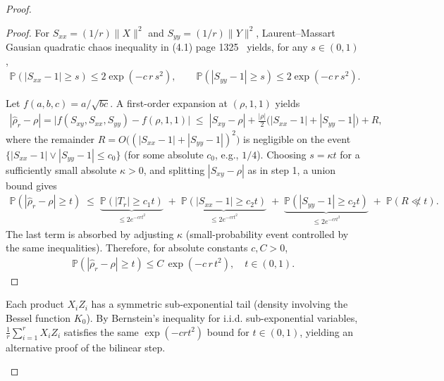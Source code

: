 \begin{proof}
\begin{proof}
    
    For $S_{xx}=(1/r)\|X\|^2$ and $S_{yy}=(1/r)\|Y\|^2$, Laurent--Massart Gausian quadratic chaos inequality in (4.1) page 1325~\cite{LaurentMassart} yields, for any $s\in(0,1)$,
\begin{align}
    \mathbb{P}\!\left(|S_{xx}-1|\ge s\right)\le 2\exp(-c\,r\,s^2),
    \qquad
    \mathbb{P}\!\left(|S_{yy}-1|\ge s\right)\le 2\exp(-c\,r\,s^2).
\end{align}
    
    
    Let $f(a,b,c)=a/\sqrt{bc}$. A first-order expansion at $(\rho,1,1)$ yields
\begin{align}
    |\hat{\rho}_r-\rho|
    = \big|f(S_{xy},S_{xx},S_{yy})-f(\rho,1,1)\big|
    \;\le\;
    |S_{xy}-\rho|+\frac{|\rho|}{2}\big(|S_{xx}-1|+|S_{yy}-1|\big)+R,
\end{align}
    where the remainder $R=O\big((|S_{xx}-1|+|S_{yy}-1|)^2\big)$ is negligible on the event
    $\{|S_{xx}-1|\vee|S_{yy}-1|\le c_0\}$ (for some absolute $c_0$, e.g., $1/4$).
    Choosing $s=\kappa t$ for a sufficiently small absolute $\kappa>0$, and splitting $|S_{xy}-\rho|$ as in step 1, a union bound gives
\begin{align}
    \mathbb{P}\!\left(|\hat{\rho}_r-\rho|\ge t\right)
    \;\le\;
    \underbrace{\mathbb{P}\!\left(|T_r|\ge c_1 t\right)}_{\le 2e^{-c r t^2}}
    \;+\;
    \underbrace{\mathbb{P}\!\left(|S_{xx}-1|\ge c_2 t\right)}_{\le 2e^{-c r t^2}}
    \;+\;
    \underbrace{\mathbb{P}\!\left(|S_{yy}-1|\ge c_2 t\right)}_{\le 2e^{-c r t^2}}
    \;+\;\mathbb{P}(R\not\ll t).
\end{align}
    The last term is absorbed by adjusting $\kappa$ (small-probability event controlled by the same inequalities).
    Therefore, for absolute constants $c,C>0$,
\begin{align}
    \mathbb{P}\!\left(|\hat{\rho}_r-\rho|\ge t\right)\le C\,\exp(-c\,r\,t^2),
    \quad t\in(0,1).
\end{align}
    \end{proof}
    
    \begin{remark}
    Each product $X_iZ_i$ has a symmetric sub-exponential tail (density involving the Bessel function $K_0$).
    By Bernstein’s inequality for i.i.d. sub-exponential variables,
    $\frac{1}{r}\sum_{i=1}^r X_iZ_i$ satisfies the same $\exp(-c r t^2)$ bound
    for $t\in(0,1)$, yielding an alternative proof of the bilinear step.
    \end{remark}



\end{proof}
